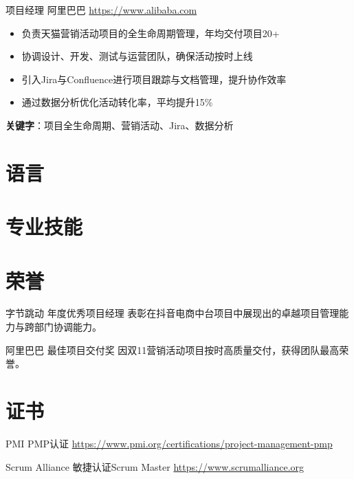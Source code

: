 \documentclass[a4paper, serif, 10pt]{moderncv}
\begin{document}
        {项目经理}
        {阿里巴巴}
        {\url{https://www.alibaba.com}}
        {}
        {\begin{itemize}
\item 负责天猫营销活动项目的全生命周期管理，年均交付项目20+
\item 协调设计、开发、测试与运营团队，确保活动按时上线
\item 引入Jira与Confluence进行项目跟踪与文档管理，提升协作效率
\item 通过数据分析优化活动转化率，平均提升15\%
\end{itemize}
\textbf{关键字}：项目全生命周期、营销活动、Jira、数据分析}
\section{语言}

\section{专业技能}

\section{荣誉}

        {字节跳动}
        {年度优秀项目经理}
        {}
        {}
        {表彰在抖音电商中台项目中展现出的卓越项目管理能力与跨部门协调能力。}

        {阿里巴巴}
        {最佳项目交付奖}
        {}
        {}
        {因双11营销活动项目按时高质量交付，获得团队最高荣誉。}
\section{证书}

        {PMI}
        {PMP认证}
        {\url{https://www.pmi.org/certifications/project-management-pmp}}
        {}
        {}

        {Scrum Alliance}
        {敏捷认证Scrum Master}
        {\url{https://www.scrumalliance.org}}
        {}
        {}
\end{document}
